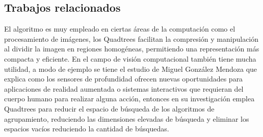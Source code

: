 \documentclass[9pt,a4paper,twoside]{rho-class/rho}
\begin{document}
        \subsection{Trabajos relacionados}
            El algoritmo es muy empleado en ciertas áreas de la computación como el procesamiento de imágenes, los Quadtrees facilitan la compresión y manipulación al dividir la imagen en regiones homogéneas, permitiendo una representación más compacta y eficiente. En el campo de visión computacional también tiene mucha utilidad, a modo de ejemplo se tiene el estudio de Miguel González Mendoza \cite{mendoza_advances} que explica como los sensores de profundidad ofrecen nuevas oportunidades para aplicaciones de realidad aumentada o sistemas interactivos que requieran del cuerpo humano para realizar alguna acción, entonces en su investigación emplea Quadtrees para reducir el espacio de búsqueda de los algoritmos de agrupamiento, reduciendo las dimensiones elevadas de búsqueda y eliminar los espacios vacíos reduciendo la cantidad de búsquedas.
\end{document}
